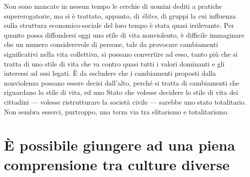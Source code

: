 \documentclass[12pt,oneside,openany]{book}
\begin{document}
Non sono mancate in nessun tempo le cerchie di uomini dediti a pratiche supererogatorie, ma si è trattato, appunto, di \emph{élites}, di gruppi la cui influenza sulla struttura economico-sociale del loro tempo è stata quasi irrilevante. Per quanto possa diffondersi oggi uno stile di vita nonviolento, è difficile immaginare che un numero considerevole di persone, tale da provocare cambiamenti significativi nella vita collettiva, si possano convertire ad esso, tanto più che si tratta di uno stile di vita che va contro quasi tutti i valori dominanti e gli interessi ad essi legati. È da escludere che i cambiamenti proposti dalla nonviolenza possano essere decisi dall'alto, perché si tratta di cambiamenti che riguardano lo stile di vita, ed uno Stato che volesse decidere lo stile di vita dei cittadini --- volesse ristrutturare la società civile --- sarebbe uno stato totalitario. Non sembra esserci, purtroppo, una terza via tra elitarismo e totalitarismo.

\setcounter{chapter}{5}\addtocounter{chapter}{-1}

\chapter{È possibile giungere ad una piena comprensione tra culture diverse}
\end{document}
